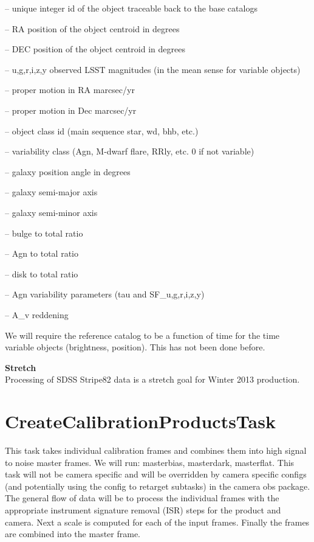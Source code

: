 \documentclass[12pt]{article}
\begin{document}
-- unique integer id of the object traceable back to the base catalogs

-- RA position of the object centroid in degrees

-- DEC position of the object centroid in degrees

-- {u,g,r,i,z,y} observed LSST magnitudes (in the mean sense for variable objects)

-- proper motion in RA marcsec/yr

-- proper motion in Dec marcsec/yr

-- object class id (main sequence star, wd, bhb, etc.)

-- variability class (Agn, M-dwarf flare, RRly, etc.  0 if not variable)

-- galaxy position angle in degrees 

-- galaxy semi-major axis 

-- galaxy semi-minor axis

-- bulge to total ratio

-- Agn to total ratio

-- disk to total ratio

-- Agn variability parameters (tau and SF\_{u,g,r,i,z,y})

-- A\_v reddening 


We will require the reference catalog to be a function of time for
the time variable objects (brightness, position).  This has not been
done before.

{\bf Stretch}\\
Processing of SDSS Stripe82 data is a stretch goal for Winter 2013
production.


\section{CreateCalibrationProductsTask} 
This task takes individual calibration frames and combines them into
high signal to noise master frames.  We will run: masterbias, masterdark, masterflat.  
This task will not be camera specific and will be overridden by camera specific configs (and potentially
using the config to retarget subtasks) in the camera obs package.  The general flow of data will be to process the individual frames
with the appropriate instrument signature removal (ISR) steps for the product and camera.  Next a scale is computed for each of the input
frames.  Finally the frames are combined into the master frame.
\end{document}
